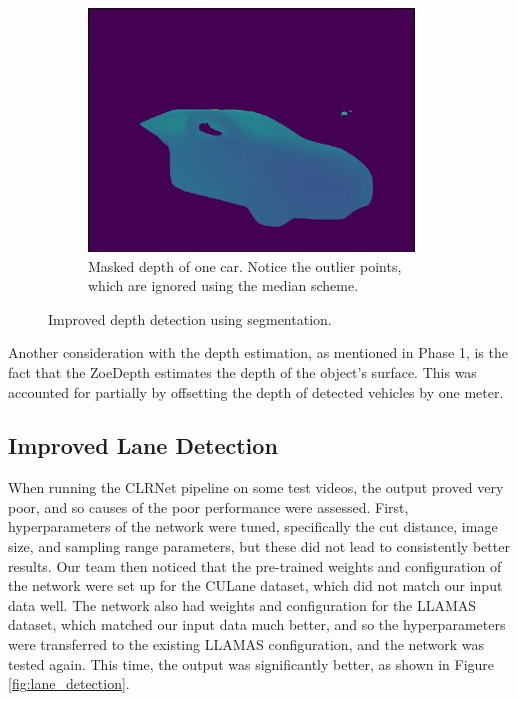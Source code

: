 \begin{figure}
\begin{subfigure}{0.9\linewidth}
    \includegraphics[width=0.95\textwidth]{images/masked_depth.jpg}
    \caption{Masked depth of one car. Notice the outlier points, which are ignored using the median scheme.}
  \end{subfigure}
  \caption{Improved depth detection using segmentation.}
  \label{fig:depth}
\end{figure}

Another consideration with the depth estimation, as mentioned in Phase 1, is the fact that the ZoeDepth estimates the depth of the object's surface. This was accounted for partially by offsetting the depth of detected vehicles by one meter.

\subsection{Improved Lane Detection}
When running the CLRNet pipeline on some test videos, the output proved very poor, and so causes of the poor performance were assessed. First, hyperparameters of the network were tuned, specifically the cut distance, image size, and sampling range parameters, but these did not lead to consistently better results. Our team then noticed that the pre-trained weights and configuration of the network were set up for the CULane dataset, which did not match our input data well. The network also had weights and configuration for the LLAMAS dataset, which matched our input data much better, and so the hyperparameters were transferred to the existing LLAMAS configuration, and the network was tested again. This time, the output was significantly better, as shown in Figure \ref{fig:lane_detection}.

